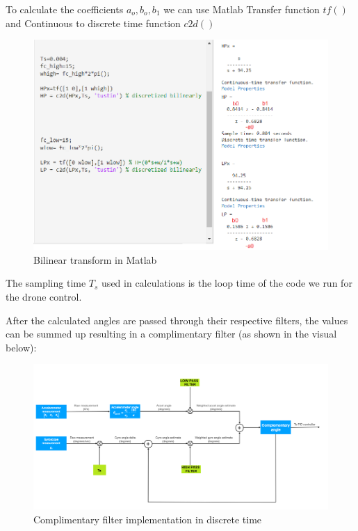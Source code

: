 \begin{flushleft}
To calculate the coefficients $a_o, b_o, b_1$ we can use Matlab Transfer function $tf()$ and Continuous to discrete time function $c2d() $
\end{flushleft}

\begin{figure}[H]
    \begin{center}
    \includegraphics[scale = 0.5]{pictures/IMU/filters_matlab.png}
    \end{center}
    \caption{Bilinear transform in Matlab}
    \label{fig:my_label}
\end{figure}


\begin{flushleft}
The sampling time $T_s$ used in calculations is the loop time of the code we run for the drone control.


After the calculated angles are passed through their respective filters, the values can be summed up resulting in a complimentary filter (as shown in the visual below):
\end{flushleft}

\begin{figure}[H]
    \begin{center}
    \includegraphics[scale = 0.5]{pictures/IMU/complementary.png}
    \end{center}
    \caption{Complimentary filter implementation in discrete time}
    \label{fig:my_label}
\end{figure}

